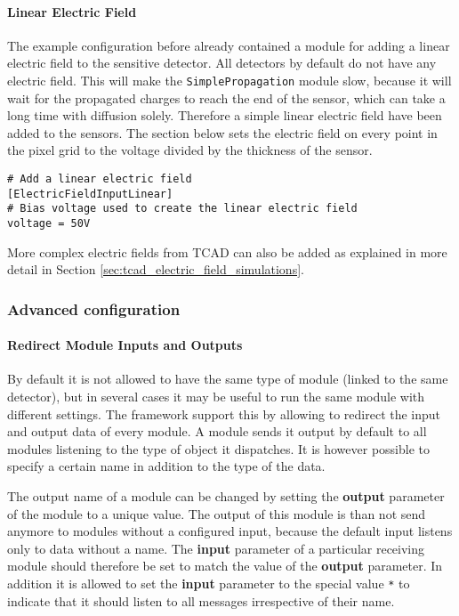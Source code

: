 \paragraph{Linear Electric Field}
\label{sec:module_electric_field}
The example configuration before already contained a module for adding a linear electric field to the sensitive detector. All detectors by default do not have any electric field. This will make the \texttt{SimplePropagation} module slow, because it will wait for the propagated charges to reach the end of the sensor, which can take a long time with diffusion solely. Therefore a simple linear electric field have been added to the sensors. The section below sets the electric field on every point in the pixel grid to the voltage divided by the thickness of the sensor.
\begin{verbatim}
# Add a linear electric field
[ElectricFieldInputLinear]
# Bias voltage used to create the linear electric field
voltage = 50V
\end{verbatim}
More complex electric fields from TCAD can also be added as explained in more detail in Section \ref{sec:tcad_electric_field_simulations}.


\subsubsection{Advanced configuration}
\paragraph{Redirect Module Inputs and Outputs}
\label{sec:redirect_module_input_outputs}
By default it is not allowed to have the same type of module (linked to the same detector), but in several cases it may be useful to run the same module with different settings. The \apsq framework support this by allowing to redirect the input and output data of every module. A module sends it output by default to all modules listening to the type of object it dispatches. It is however possible to specify a certain name in addition to the type of the data.

The output name of a module can be changed by setting the \textbf{output} parameter of the module to a unique value. The output of this module is than not send anymore to modules without a configured input, because the default input listens only to data without a name. The \textbf{input} parameter of a particular receiving module should therefore be set to match the value of the \textbf{output} parameter. In addition it is allowed to set the \textbf{input} parameter to the special value \texttt{*} to indicate that it should listen to all messages irrespective of their name.

